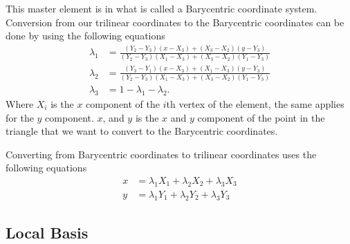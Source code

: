 \documentclass[../fem.tex]{subfiles}
\begin{document}
\begin{Figure}
   \begin{center}
   \end{center}
   \label{fig:master_element}
\end{Figure}

This master element is in what is called a Barycentric coordinate system.
Conversion from our trilinear coordinates to the Barycentric coordinates can be
done by using the following equations
\begin{align*}
  \lambda_1 &=
  \frac{\left(Y_2-Y_3\right)\left(x-X_3\right)+\left(X_3-X_2\right)\left(y-Y_3\right)}{\left(Y_2-Y_3\right)\left(X_1-X_3\right)+\left(X_3-X_2\right)\left(Y_1-Y_3\right)}\\
  \lambda_2 &=
  \frac{\left(Y_3-Y_1\right)\left(x-X_3\right)+\left(X_1-X_3\right)\left(y-Y_3\right)}{\left(Y_2-Y_3\right)\left(X_1-X_3\right)+\left(X_3-X_2\right)\left(Y_1-Y_3\right)}\\
  \lambda_3 &= 1-\lambda_1-\lambda_2.
\end{align*}
Where $X_i$ is the $x$ component of the $i$th vertex of the element, the same
applies for the $y$ component. $x$, and $y$ is the $x$ and $y$ component of the
point in the triangle that we want to convert to the Barycentric coordinates.

Converting from Barycentric coordinates to trilinear coordinates uses the
following equations
\begin{align*}
  x &= \lambda_1 X_1+\lambda_2 X_2 + \lambda_3 X_3\\
  y &= \lambda_1 Y_1 +\lambda_2 Y_2 + \lambda_3 Y_3
\end{align*}

\subsection{Local Basis}%
\label{sub:local_basis}
\end{document}
